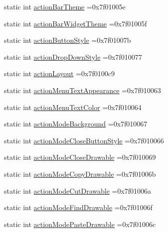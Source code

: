 \begin{DoxyCompactItemize}
\item 
static int \hyperlink{classandroid_1_1support_1_1design_1_1R_1_1attr_aa73a7a3e8185f77a2a9cfffdaeb18049}{action\+Bar\+Theme} =0x7f01005e
\item 
static int \hyperlink{classandroid_1_1support_1_1design_1_1R_1_1attr_a6cb38d746e53af08824c992a2ee02166}{action\+Bar\+Widget\+Theme} =0x7f01005f
\item 
static int \hyperlink{classandroid_1_1support_1_1design_1_1R_1_1attr_a6964dc5822bfe14e17b180380fe43d25}{action\+Button\+Style} =0x7f01007b
\item 
static int \hyperlink{classandroid_1_1support_1_1design_1_1R_1_1attr_a51dfb6b1d3d9ab814d446239f5179560}{action\+Drop\+Down\+Style} =0x7f010077
\item 
static int \hyperlink{classandroid_1_1support_1_1design_1_1R_1_1attr_a5dd4eba3b7ab21a3ccd2091e9c0ad8e2}{action\+Layout} =0x7f0100c9
\item 
static int \hyperlink{classandroid_1_1support_1_1design_1_1R_1_1attr_abd2423af4cddf87be76d52972a8648de}{action\+Menu\+Text\+Appearance} =0x7f010063
\item 
static int \hyperlink{classandroid_1_1support_1_1design_1_1R_1_1attr_aa57a8ae5add076494a575c2c4bd55adb}{action\+Menu\+Text\+Color} =0x7f010064
\item 
static int \hyperlink{classandroid_1_1support_1_1design_1_1R_1_1attr_a25ba85cbbc94b7b1a638506bcd7914df}{action\+Mode\+Background} =0x7f010067
\item 
static int \hyperlink{classandroid_1_1support_1_1design_1_1R_1_1attr_af2fceeea8a5606613dd831df4b13e4e9}{action\+Mode\+Close\+Button\+Style} =0x7f010066
\item 
static int \hyperlink{classandroid_1_1support_1_1design_1_1R_1_1attr_a9cced00fc0348684dc2d08ec0bcf9dad}{action\+Mode\+Close\+Drawable} =0x7f010069
\item 
static int \hyperlink{classandroid_1_1support_1_1design_1_1R_1_1attr_ac3f8d06ef8dc101fffba261667ce9abf}{action\+Mode\+Copy\+Drawable} =0x7f01006b
\item 
static int \hyperlink{classandroid_1_1support_1_1design_1_1R_1_1attr_a3b413691753b336a34ebf1925fa20ae7}{action\+Mode\+Cut\+Drawable} =0x7f01006a
\item 
static int \hyperlink{classandroid_1_1support_1_1design_1_1R_1_1attr_a6c300bed753442a0bfe70d18f1540cfc}{action\+Mode\+Find\+Drawable} =0x7f01006f
\item 
static int \hyperlink{classandroid_1_1support_1_1design_1_1R_1_1attr_a116ae2612632257c3b1e67f63fa9fc63}{action\+Mode\+Paste\+Drawable} =0x7f01006c

\end{DoxyCompactItemize}
